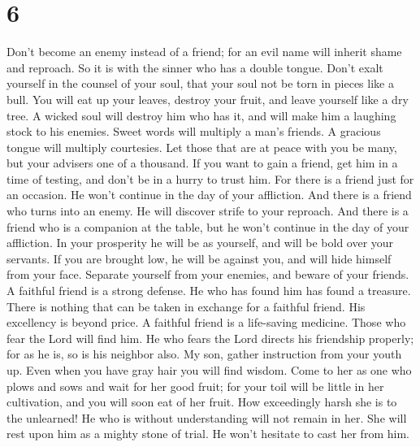 \hypertarget{section-4}{%
\section{6}\label{section-4}}

 Don't become an enemy instead of a friend; for an evil
name will inherit shame and reproach. So it is with the sinner who has a
double tongue.  Don't exalt yourself in the counsel of
your soul, that your soul not be torn in pieces like a bull.
 You will eat up your leaves, destroy your fruit, and
leave yourself like a dry tree.  A wicked soul will
destroy him who has it, and will make him a laughing stock to his
enemies.  Sweet words will multiply a man's friends. A
gracious tongue will multiply courtesies.  Let those that
are at peace with you be many, but your advisers one of a thousand.
 If you want to gain a friend, get him in a time of
testing, and don't be in a hurry to trust him.  For there
is a friend just for an occasion. He won't continue in the day of your
affliction.  And there is a friend who turns into an
enemy. He will discover strife to your reproach.  And
there is a friend who is a companion at the table, but he won't continue
in the day of your affliction.  In your prosperity he
will be as yourself, and will be bold over your servants.
 If you are brought low, he will be against you, and will
hide himself from your face.  Separate yourself from your
enemies, and beware of your friends.  A faithful friend
is a strong defense. He who has found him has found a treasure.
 There is nothing that can be taken in exchange for a
faithful friend. His excellency is beyond price.  A
faithful friend is a life-saving medicine. Those who fear the Lord will
find him.  He who fears the Lord directs his friendship
properly; for as he is, so is his neighbor also.  My son,
gather instruction from your youth up. Even when you have gray hair you
will find wisdom.  Come to her as one who plows and sows
and wait for her good fruit; for your toil will be little in her
cultivation, and you will soon eat of her fruit.  How
exceedingly harsh she is to the unlearned! He who is without
understanding will not remain in her.  She will rest upon
him as a mighty stone of trial. He won't hesitate to cast her from him.
